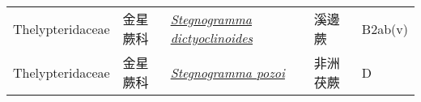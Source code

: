 {\begin{longtable}{L{2.5cm}L{2cm}L{5cm}L{2.5cm}L{3cm}}
    Thelypteridaceae & 金星蕨科 & \href{http://www.theplantlist.org/tpl1.1/search?q=Stegnogramma+dictyoclinoides}{\textit{Stegnogramma dictyoclinoides} } & 溪邊蕨 & B2ab(v)    \\
    Thelypteridaceae & 金星蕨科 & \href{http://www.theplantlist.org/tpl1.1/search?q=Stegnogramma+pozoi}{\textit{Stegnogramma pozoi} } & 非洲茯蕨 & D    \\
    \bottomrule
        \end{longtable}
        }
    